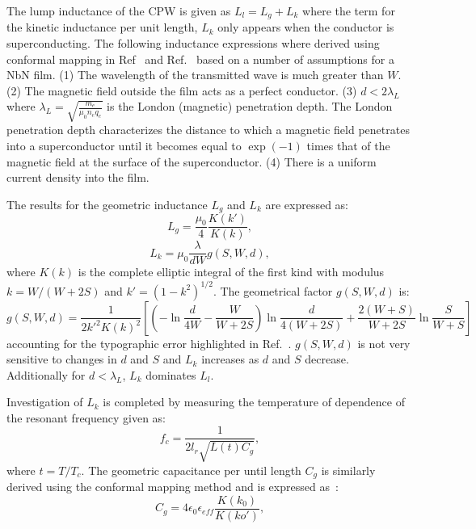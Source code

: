 The lump inductance of the CPW is given as $L_{l} = L_{g}+L_{k}$ where the term for the kinetic inductance per unit length, $L_{k}$ only appears when the conductor is superconducting. The following inductance expressions where derived using conformal mapping in Ref~\citep{1347-4065-33-10R-5708} and Ref.~\citep{402973} based on a number of assumptions for a NbN film. (1) The wavelength of the transmitted wave is much greater than $W$. (2) The magnetic field outside the film acts as a perfect conductor. (3) $d < 2 \lambda_{L}$ where $\lambda_{L}=\sqrt{\frac{m_{e}}{\mu_{0} n_{e}q_{e}}}$  is the London (magnetic) penetration depth. The London penetration depth characterizes the distance to which a magnetic field penetrates into a superconductor until it becomes equal to $\exp(-1)$ times that of the magnetic field at the surface of the superconductor. (4) There is a uniform current density into the film. 

The results for the geometric inductance $L_{g}$ and $L_{k}$ are expressed as:
 \begin{equation}
\label{eq:geometricinductance}
L_{g} = \frac{\mu_{0}}{4}\frac{K(k')}{K(k)},
\end{equation}
\begin{equation}
\label{eq:kineticcapacitance}
L_{k} = \mu_{0}\frac{\lambda}{dW} g(S,W,d),
\end{equation} 
\noindent where $K(k)$ is the complete elliptic integral of the first kind with modulus $k = W /(W + 2S)$ and $k'=(1-k^{2})^{1/2}$. The geometrical factor $g(S , W, d)$ is:
\begin{equation}
\label{eq:geometricfactor}
g(S,W,d) = \frac{1}{2k'^{2}K(k)^{2}} \left [ \left ( -\ln{\frac{d}{4 W}}-\frac{W}{W+2S} \right ) \ln{\frac{d}{4(W+2S)}} + \frac{2(W+S)}{W+2S} \ln{\frac{S}{W+S}} \right ]
\end{equation}
\noindent accounting for the typographic error highlighted in Ref.~\citep{doi:10.1063/1.4773070}. $g(S,W,d)$ is not very sensitive to changes in $d$ and $S$ and $L_{k}$ increases as $d$ and $S$ decrease.  Additionally for $d < \lambda_{L}$, $L_{k}$ dominates $L_{l}$. 

Investigation of $L_{k}$ is completed by measuring the temperature of dependence of the resonant frequency given as:   
 \begin{equation}
\label{eq:tempresonantfrequency}
f_{c}=\frac{1}{2 l_{r} \sqrt{L(t)C_{g}}},
\end{equation}
\noindent where $t = T/T_{c}$. The geometric capacitance per until length $C_{g}$ is similarly derived using the conformal mapping method and is expressed as~\citep{doi:10.1063/1.3010859}: 
\begin{equation}
\label{eq:geometriccapacitance}
C_{g}=4\epsilon_{0}\epsilon_{eff}\frac{K(k_{0})}{K(ko')},
\end{equation}

